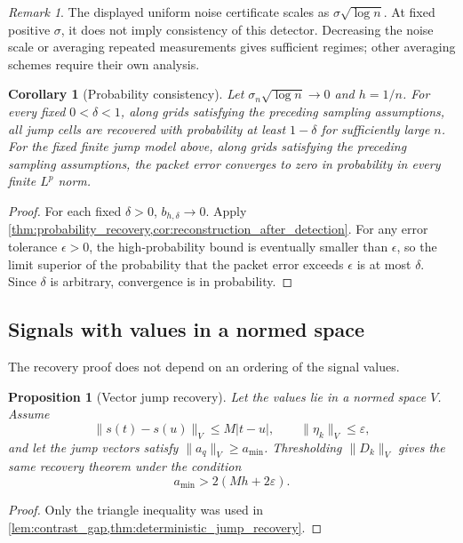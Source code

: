 \documentclass[11pt,a4paper]{article}
\newtheorem{proposition}[theorem]{Proposition}
\newtheorem{corollary}[theorem]{Corollary}
\theoremstyle{definition}
\theoremstyle{remark}
\newtheorem{remark}[theorem]{Remark}
\begin{document}
\begin{remark}\label{rem:noise_scaling}
The displayed uniform noise certificate scales as \(\sigma\sqrt{\log n}\). At fixed positive \(\sigma\), it does not imply consistency of this detector. Decreasing the noise scale or averaging repeated measurements gives sufficient regimes; other averaging schemes require their own analysis.
\end{remark}

\begin{corollary}[Probability consistency]\label{cor:probability_consistency}
Let \(\sigma_n\sqrt{\log n}\to0\) and \(h=1/n\). For every fixed \(0<\delta<1\), along grids satisfying the preceding sampling assumptions, all jump cells are recovered with probability at least \(1-\delta\) for sufficiently large \(n\). For the fixed finite jump model above, along grids satisfying the preceding sampling assumptions, the packet error converges to zero in probability in every finite \(L^p\) norm.
\end{corollary}

\begin{proof}
For each fixed \(\delta>0\), \(b_{h,\delta}\to0\). Apply \cref{thm:probability_recovery,cor:reconstruction_after_detection}. For any error tolerance \(\epsilon>0\), the high-probability bound is eventually smaller than \(\epsilon\), so the limit superior of the probability that the packet error exceeds \(\epsilon\) is at most \(\delta\). Since \(\delta\) is arbitrary, convergence is in probability.
\end{proof}

\subsection{Signals with values in a normed space}

The recovery proof does not depend on an ordering of the signal values.

\begin{proposition}[Vector jump recovery]\label{prop:vector_jump_recovery}
Let the values lie in a normed space \(V\). Assume
\[
\|s(t)-s(u)\|_V\leq M|t-u|,
\qquad
\|\eta_k\|_V\leq\varepsilon,
\]
and let the jump vectors satisfy \(\|a_q\|_V\geq a_{\min}\). Thresholding \(\|D_k\|_V\) gives the same recovery theorem under the condition
\[
a_{\min}>2(Mh+2\varepsilon).
\]
\end{proposition}

\begin{proof}
Only the triangle inequality was used in \cref{lem:contrast_gap,thm:deterministic_jump_recovery}.
\end{proof}
\end{document}
